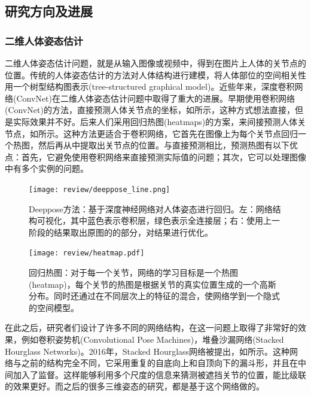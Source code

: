 \begin{refsection}
\subsection{研究方向及进展}
\subsubsection{二维人体姿态估计}
二维人体姿态估计问题，就是从输入图像或视频中，得到在图片上人体的关节点的位置。传统的人体姿态估计的方法对人体结构进行建模，将人体部位的空间相关性用一个树型结构图表示(tree-structured graphical model)\autocite{eichner20122d}。近些年来，深度卷积网络(ConvNet)在二维人体姿态估计问题中取得了重大的进展。早期使用卷积网络(ConvNet)的方法，直接预测人体关节点的坐标\autocite{toshev2014deep}，如所示，这种方式想法直接，但是实际效果并不好。后来人们采用回归热图(heatmaps)\autocite{pfister2015flowing}的方案，来间接预测人体关节点，如所示。这种方法更适合于卷积网络，它首先在图像上为每个关节点回归一个热图，然后再从中提取出关节点的位置。与直接预测相比，预测热图有以下优点：首先，它避免使用卷积网络来直接预测实际值的问题；其次，它可以处理图像中有多个实例的问题。
\begin{figure}[ht]
    \texttt{[image: review/deeppose\_line.png]}
    \caption{Deeppose方法\autocite{toshev2014deep}：基于深度神经网络对人体姿态进行回归。左：网络结构可视化，其中蓝色表示卷积层，绿色表示全连接层；右：使用上一阶段的结果取出原图的的部分，对结果进行优化。}\label{fig:deeppose}
\end{figure}
  
\begin{figure}[ht]
    \texttt{[image: review/heatmap.pdf]}
    \caption{回归热图\autocite{pfister2015flowing}：对于每一个关节，网络的学习目标是一个热图(heatmap)，每个关节的热图是根据关节的真实位置生成的一个高斯分布。同时还通过在不同层次上的特征的混合，使网络学到一个隐式的空间模型。}\label{fig:heatmap}
\end{figure}

在此之后，研究者们设计了许多不同的网络结构，在这一问题上取得了非常好的效果，例如卷积姿势机(Convolutional Pose Machines)，堆叠沙漏网络(Stacked Hourglass Networks)\cite{newell2016stacked}。2016年，Stacked Hourglass网络\cite{newell2016stacked}被提出，如所示。这种网络与之前的结构完全不同，它采用重复的自底向上和自顶向下的漏斗形，并且在中间加入了监督。这样能够利用多个尺度的信息来猜测被遮挡关节的位置，能比级联的效果更好。而之后的很多三维姿态的研究，都是基于这个网络做的。


\end{refsection}
